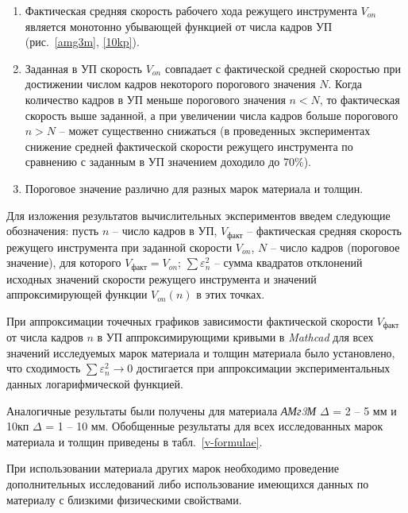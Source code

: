 \documentclass[11pt,twoside,openany]{report}
\begin{document}
\begin{enumerate}
\item
Фактическая средняя скорость рабочего хода режущего инструмента
$V_{on}$
является монотонно убывающей функцией от числа кадров УП
(рис.~\ref{amg3m}, \ref{10kp}).

\item
Заданная в УП скорость
$V_{on}$
совпадает с фактической средней скоростью
при достижении числом кадров некоторого порогового значения $N$.
Когда количество кадров в УП меньше порогового значения $n<N$,
то фактическая скорость выше заданной,
а при увеличении числа кадров больше порогового $n>N$
-- может существенно снижаться
(в проведенных экспериментах снижение средней
фактической скорости режущего инструмента по сравнению
с заданным в УП значением доходило до 70\%).

\item
Пороговое значение различно для разных марок материала и толщин.

\end{enumerate}

Для изложения результатов вычислительных экспериментов
введем следующие обозначения:
пусть
$n$ -- число кадров в УП,
$V_\text{факт}$ -- фактическая средняя скорость режущего инструмента при заданной скорости $V_{on}$,
$N$ -- число кадров (пороговое значение), для которого $V_\text{факт}=V_{on}$;
$\sum \varepsilon_n^2$ -- сумма квадратов отклонений исходных значений
скорости режущего инструмента и значений аппроксимирующей функции $V_{on}(n)$
в этих точках.

При аппроксимации точечных графиков
зависимости фактической скорости
$V_\text{факт}$
от числа кадров $n$
в УП аппроксимирующими кривыми в
{\it Mathcad}
для всех значений исследуемых марок материала и толщин материала было установлено,
что сходимость
$\sum \varepsilon_n^2 \to 0$
достигается при аппроксимации экспериментальных данных логарифмической функцией.

Аналогичные результаты были получены для материала
{\it АМг3М} $\Delta$ = 2 -- 5 мм
и 10кп $\Delta$ = 1 -- 10 мм.
Обобщенные результаты для всех исследованных марок материала и толщин
приведены в табл.~\ref{v-formulae}.

При использовании материала других марок
необходимо проведение дополнительных исследований
либо использование имеющихся данных по материалу
с близкими физическими свойствами.
\end{document}
